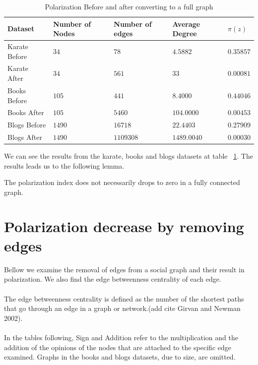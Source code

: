 \begin{table}[!htbp]
 \centering
 \caption{Polarization Before and after converting to a full graph}
 \label{tab:fullgraph}
 \begin{tabular}{| l || l | l | l | l |}
 \hline
  Dataset & Number of Nodes & Number of edges & Average Degree & $\pi(z)$\\
  \hline
  \hline
  Karate Before & $34$ & $78$ & $4.5882$ &  $0.35857$\\
  \hline
  Karate After & $34$ & $561$ & $33$ &  $0.00081$\\
  \hline
  \hline
  Books Before & $105$ & $441$ & $8.4000$ &  $0.44046$\\
  \hline
  Books After & $105$ & $5460$ & $104.0000$ &  $0.00453$\\
  \hline
  \hline
  Blogs Before & $1490$ & $16718$ & $22.4403$ &  $0.27909$\\
  \hline
  Blogs After & $1490$ & $1109308$ & $1489.0040$ &  $0.00030$\\
  \hline
 \end{tabular}
 \end{table}

\vspace{20pt}
\noindent
We can see the results from the karate, books and blogs datasets at table ~\ref{tab:fullgraph}. The results leads us to the following lemma.
\\	
\begin{lemma}
The polarization index does not necessarily drops to zero in a fully connected graph.
\end{lemma}


\section{Polarization decrease by removing edges}
\label{sec:polremovingdecrease}
Bellow we examine the removal of edges from a social graph and their result in polarization. We also find the edge betweenness centrality of each edge. 
\\
\\
The edge betweenness centrality is defined as the number of the shortest paths that go through an edge in a graph or network.(add cite Girvan and Newman 2002). 
\\
\\
In the tables following, Sign and Addition refer to the multiplication and the addition of the opinions of the nodes that are attached to the specific edge examined. Graphs in the books and blogs datasets, due to size, are omitted.
\\
\\

